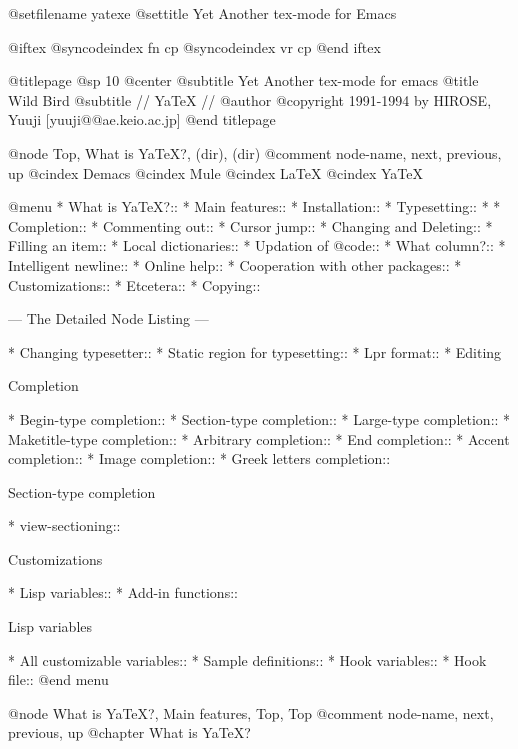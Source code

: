
@setfilename yatexe
@settitle Yet Another tex-mode for Emacs

@iftex
@syncodeindex fn cp
@syncodeindex vr cp
@end iftex

@titlepage
@sp 10
@center
@subtitle Yet Another tex-mode for emacs
@title Wild Bird
@subtitle // YaTeX //
@author @copyright{} 1991-1994 by    HIROSE, Yuuji [yuuji@@ae.keio.ac.jp]
@end titlepage

@node Top, What is YaTeX?, (dir), (dir)
@comment  node-name,  next,  previous,  up
@cindex Demacs
@cindex Mule
@cindex LaTeX
@cindex YaTeX

@menu
* What is YaTeX?::              
* Main features::               
* Installation::                
* Typesetting::                 
* %
* Completion::                  
* Commenting out::              
* Cursor jump::                 
* Changing and Deleting::       
* Filling an item::             
* Local dictionaries::          
* Updation of @code{}::  
* What column?::                
* Intelligent newline::         
* Online help::                 
* Cooperation with other packages::  
* Customizations::              
* Etcetera::                    
* Copying::                     

 --- The Detailed Node Listing ---


* Changing typesetter::         
* Static region for typesetting::  
* Lpr format::                  
* Editing %

Completion

* Begin-type completion::       
* Section-type completion::     
* Large-type completion::       
* Maketitle-type completion::   
* Arbitrary completion::        
* End completion::              
* Accent completion::           
* Image completion::            
* Greek letters completion::    

Section-type completion

* view-sectioning::             

Customizations

* Lisp variables::              
* Add-in functions::            

Lisp variables

* All customizable variables::  
* Sample definitions::          
* Hook variables::              
* Hook file::                   
@end menu

@node What is YaTeX?, Main features, Top, Top
@comment  node-name,  next,  previous,  up
@chapter What is YaTeX?

